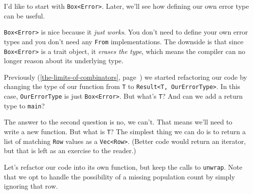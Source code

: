 \documentclass[a4paper,]{book}
\renewcommand*{\hyperref}[2][\ar]{%
  \def\ar{#2}%
  #2 (\autoref{#1}, page~\pageref{#1})}
\begin{document}
I'd like to start with \texttt{Box\textless{}Error\textgreater{}}.
Later, we'll see how defining our own error type can be useful.


\texttt{Box\textless{}Error\textgreater{}} is nice because it \emph{just
works}. You don't need to define your own error types and you don't need
any \texttt{From} implementations. The downside is that since
\texttt{Box\textless{}Error\textgreater{}} is a trait object, it
\emph{erases the type}, which means the compiler can no longer reason
about its underlying type.

\hyperref[the-limits-of-combinators]{Previously} we started refactoring
our code by changing the type of our function from \texttt{T} to
\texttt{Result\textless{}T,\ OurErrorType\textgreater{}}. In this case,
\texttt{OurErrorType} is just
\texttt{Box\textless{}Error\textgreater{}}. But what's \texttt{T}? And
can we add a return type to \texttt{main}?

The answer to the second question is no, we can't. That means we'll need
to write a new function. But what is \texttt{T}? The simplest thing we
can do is to return a list of matching \texttt{Row} values as a
\texttt{Vec\textless{}Row\textgreater{}}. (Better code would return an
iterator, but that is left as an exercise to the reader.)

Let's refactor our code into its own function, but keep the calls to
\texttt{unwrap}. Note that we opt to handle the possibility of a missing
population count by simply ignoring that row.
\end{document}
